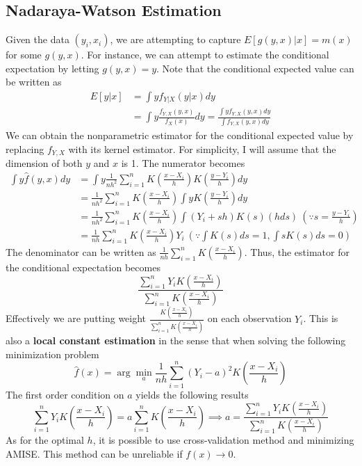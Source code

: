 \documentclass[12pt]{article}
\theoremstyle{definition}
\theoremstyle{property}
\theoremstyle{assumption}
\theoremstyle{example}
\theoremstyle{comment}
\begin{document}
 \subsection{Nadaraya-Watson Estimation}
 Given the data $(y_i,x_i)$, we are attempting to capture $E[g(y,x)|x]=m(x)$ for some $g(y,x)$. For instance, we can attempt to estimate the conditional expectation by letting $g(y,x)=y$. Note that the conditional expected value can be written as
 \begin{align*}
 E[y|x]&=\int y f_{Y|X}(y|x)dy \\
 &=\int y \frac{f_{Y,X}(y,x)}{f_{X}(x)}dy=\frac{\int yf_{Y,X}(y,x)dy}{\int f_{Y,X}(y,x)dy}
 \end{align*}
 We can obtain the nonparametric estimator for the conditional expected value by replacing $f_{Y,X}$ with its kernel estimator. For simplicity, I will assume that the dimension of both $y$ and $x$ is 1. The numerator becomes
 \footnotesize{\begin{align*}
 \int y \hat{f}(y,x)dy&=\int y \frac{1}{nh^2}\sum_{i=1}^n K\left(\frac{x-X_i}{h}\right)K\left(\frac{y-Y_i}{h}\right)dy\\
 &= \frac{1}{nh^2}\sum_{i=1}^n K\left(\frac{x-X_i}{h}\right)\int yK\left(\frac{y-Y_i}{h}\right)dy\\
 &=\frac{1}{nh^2}\sum_{i=1}^n K\left(\frac{x-X_i}{h}\right)\int (Y_i+sh)K\left(s\right)(hds) \ (\because s=\frac{y-Y_i}{h})\\
 &= \frac{1}{nh}\sum_{i=1}^n K\left(\frac{x-X_i}{h}\right)Y_i\ (\because \int K(s)ds=1, \int sK(s)ds=0)
 \end{align*}}\normalsize
 The denominator can be written as $ \frac{1}{nh}\sum_{i=1}^n K\left(\frac{x-X_i}{h}\right)$. Thus, the estimator for the conditional expectation becomes
 \[
 \frac{\sum_{i=1}^n Y_iK\left(\frac{x-X_i}{h}\right)}{\sum_{i=1}^n K\left(\frac{x-X_i}{h}\right)}
 \]
 Effectively we are putting weight $\frac{K\left(\frac{x-X_i}{h}\right)}{\sum_{i=1}^nK\left(\frac{x-X_i}{h}\right)}$ on each observation $Y_i$. This is also a \textbf{local constant estimation} in the sense that when solving the following minimization problem
 \[
 \hat{f}(x)=\arg\min_a\frac{1}{nh}\sum_{i=1}^n(Y_i-a)^2K\left(\frac{x-X_i}{h}\right)
 \]
 The first order condition on $a$ yields the following results
 \[
 \sum_{i=1}^nY_iK\left(\frac{x-X_i}{h}\right)=a\sum_{i=1}^nK\left(\frac{x-X_i}{h}\right) \implies a= \frac{\sum_{i=1}^n Y_iK\left(\frac{x-X_i}{h}\right)}{\sum_{i=1}^n K\left(\frac{x-X_i}{h}\right)}
 \]
 As for the optimal $h$, it is possible to use cross-validation method and minimizing AMISE. This method can be unreliable if $f(x)\to0$. \par
\end{document}
